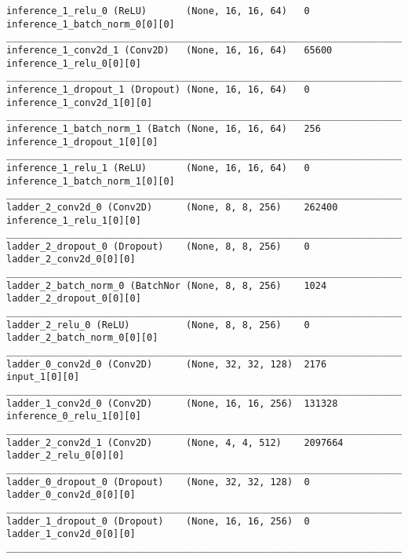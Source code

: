 \begin{lstlisting}[caption={dSprites-\ac{VLAE} Encoder},captionpos=b,basicstyle=\tiny, label={lst:dsprites-vlae-encoder}]
inference_1_relu_0 (ReLU)       (None, 16, 16, 64)   0           inference_1_batch_norm_0[0][0]
__________________________________________________________________________________________________
inference_1_conv2d_1 (Conv2D)   (None, 16, 16, 64)   65600       inference_1_relu_0[0][0]
__________________________________________________________________________________________________
inference_1_dropout_1 (Dropout) (None, 16, 16, 64)   0           inference_1_conv2d_1[0][0]
__________________________________________________________________________________________________
inference_1_batch_norm_1 (Batch (None, 16, 16, 64)   256         inference_1_dropout_1[0][0]
__________________________________________________________________________________________________
inference_1_relu_1 (ReLU)       (None, 16, 16, 64)   0           inference_1_batch_norm_1[0][0]
__________________________________________________________________________________________________
ladder_2_conv2d_0 (Conv2D)      (None, 8, 8, 256)    262400      inference_1_relu_1[0][0]
__________________________________________________________________________________________________
ladder_2_dropout_0 (Dropout)    (None, 8, 8, 256)    0           ladder_2_conv2d_0[0][0]
__________________________________________________________________________________________________
ladder_2_batch_norm_0 (BatchNor (None, 8, 8, 256)    1024        ladder_2_dropout_0[0][0]
__________________________________________________________________________________________________
ladder_2_relu_0 (ReLU)          (None, 8, 8, 256)    0           ladder_2_batch_norm_0[0][0]
__________________________________________________________________________________________________
ladder_0_conv2d_0 (Conv2D)      (None, 32, 32, 128)  2176        input_1[0][0]
__________________________________________________________________________________________________
ladder_1_conv2d_0 (Conv2D)      (None, 16, 16, 256)  131328      inference_0_relu_1[0][0]
__________________________________________________________________________________________________
ladder_2_conv2d_1 (Conv2D)      (None, 4, 4, 512)    2097664     ladder_2_relu_0[0][0]
__________________________________________________________________________________________________
ladder_0_dropout_0 (Dropout)    (None, 32, 32, 128)  0           ladder_0_conv2d_0[0][0]
__________________________________________________________________________________________________
ladder_1_dropout_0 (Dropout)    (None, 16, 16, 256)  0           ladder_1_conv2d_0[0][0]
__________________________________________________________________________________________________

\end{lstlisting}

